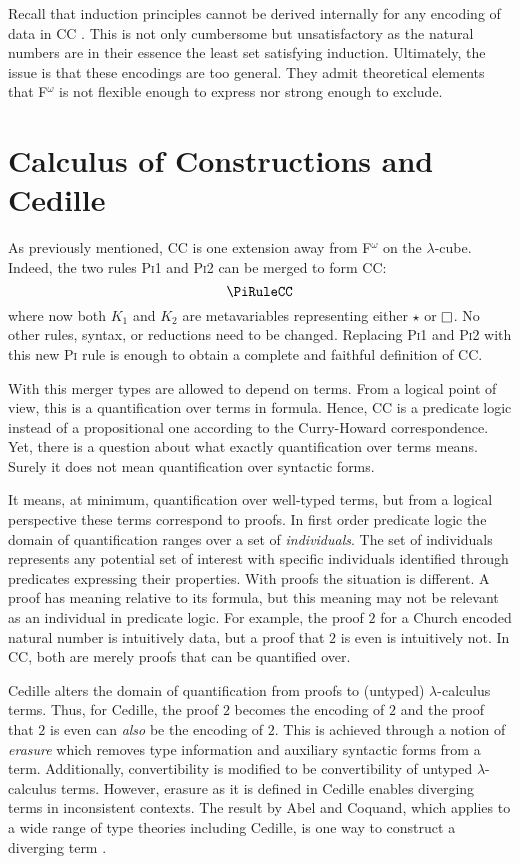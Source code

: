 Recall that induction principles cannot be derived internally for any encoding of data in CC \cite{geuvers2001_noind}.
This is not only cumbersome but unsatisfactory as the natural numbers are in their essence the least set satisfying induction.
Ultimately, the issue is that these encodings are too general.
They admit theoretical elements that F$^\omega$ is not flexible enough to express nor strong enough to exclude.

\section{Calculus of Constructions and Cedille}

As previously mentioned, CC is one extension away from F$^\omega$ on the $\lambda$-cube.
Indeed, the two rules \textsc{Pi1} and \textsc{Pi2} can be merged to form CC:
$$\PiRuleCC$$
where now both $K_1$ and $K_2$ are metavariables representing either $\star$ or $\kind$.
No other rules, syntax, or reductions need to be changed.
Replacing \textsc{Pi1} and \textsc{Pi2} with this new \textsc{Pi} rule is enough to obtain a complete and faithful definition of CC.

With this merger types are allowed to depend on terms.
From a logical point of view, this is a quantification over terms in formula.
Hence, CC is a predicate logic instead of a propositional one according to the Curry-Howard correspondence.
Yet, there is a question about what exactly quantification over terms means.
Surely it does not mean quantification over syntactic forms.

It means, at minimum, quantification over well-typed terms, but from a logical perspective these terms correspond to proofs.
In first order predicate logic the domain of quantification ranges over a set of \textit{individuals}.
The set of individuals represents any potential set of interest with specific individuals identified through predicates expressing their properties.
With proofs the situation is different.
A proof has meaning relative to its formula, but this meaning may not be relevant as an individual in predicate logic.
For example, the proof $2$ for a Church encoded natural number is intuitively data, but a proof that $2$ is even is intuitively not.
In CC, both are merely proofs that can be quantified over.

Cedille alters the domain of quantification from proofs to (untyped) $\lambda$-calculus terms.
Thus, for Cedille, the proof $2$ becomes the encoding of $2$ and the proof that $2$ is even can \textit{also} be the encoding of $2$.
This is achieved through a notion of \textit{erasure} which removes type information and auxiliary syntactic forms from a term.
Additionally, convertibility is modified to be convertibility of untyped $\lambda$-calculus terms.
However, erasure as it is defined in Cedille enables diverging terms in inconsistent contexts.
The result by Abel and Coquand, which applies to a wide range of type theories including Cedille, is one way to construct a diverging term \cite{abel2020_normalization}.

